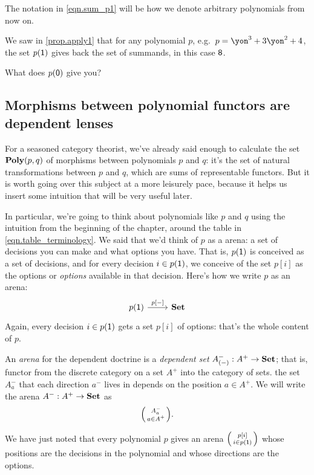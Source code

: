 \documentclass[DynamicalBook]{subfiles}
\begin{document}
The notation in \eqref{eqn.sum_p1} will be how we denote arbitrary polynomials from now on.

\begin{exercise}\label{exc.apply0}
We saw in \cref{prop.apply1} that for any polynomial $p$, e.g.\ $p=\yon^3+3\yon^2+4$, the set $p(\textsf{1})$ gives back the set of summands, in this case $\textsf{8}$. 

What does $p(\textsf{0})$ give you?
\end{exercise}

\subsection{Morphisms between polynomial functors are dependent lenses}
\label{subsec.understanding_mor_poly}

For a seasoned category theorist, we've already said enough to calculate the set $\textbf{Poly}(p,q)$ of morphisms between polynomials $p$ and $q$: it's the set of natural transformations between $p$ and $q$, which are sums of representable functors. But it is worth going over this subject at a more leisurely pace, because it helps us insert some intuition that will be very useful later.

In particular, we're going to think about polynomials like $p$ and $q$ using the
intuition from the beginning of the chapter, around the table in
\eqref{eqn.table_terminology}. We said that we'd think of $p$ as a arena: a set
of decisions you can make and what options you have. That is, $p(\textsf{1})$ is
conceived as a set of decisions, and for every decision $i\in p(\textsf{1})$, we
conceive of the set $p[i]$ as the options or \emph{options} available in that
decision. Here's how we write $p$ as an arena:
\[
\begin{tikzcd}
p(\1)\ar[r, "{p[-]}"]&\smset
\end{tikzcd}
\]
Again, every decision $i\in p(\textsf{1})$ gets a set $p[i]$ of options: that's the whole
content of $p$.
\begin{definition}\label{def.arena_poly}
  An \emph{arena} for the dependent doctrine is a \emph{dependent set} $A^-_{(-)} :
  A^+ \to \textbf{Set}$; that is, functor from the discrete category on a set $A^+$
  into the category of sets. the set $A^-_{a}$ that each direction $a^-$ lives in
  depends on the position $a \in A^+$. We will write the arena $A^- : A^+ \to
  \textbf{Set}$ as
  \[\lens{A^-_{a}}{a \in A^+}.\]
\end{definition}

We have just noted that every polynomial $p$ gives an arena $\lens{p[i]}{i \in p(\1)}$ whose positions are the decisions in the polynomial and whose directions
are the options.
\end{document}
